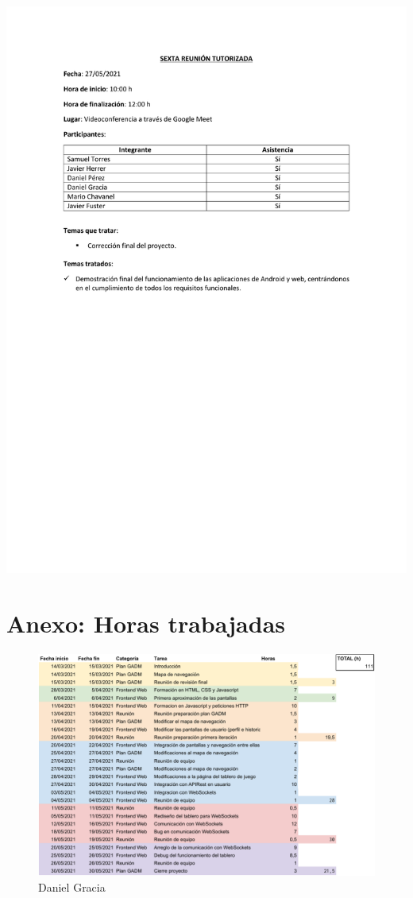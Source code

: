 \documentclass{article}
\begin{document}
\includegraphics[width=\textwidth]{../images/actas/Acta_reunion_tutorizada_6.pdf}
\break

\FloatBarrier
\section{Anexo: Horas trabajadas} \label{anexo:horas-trabajadas}


\begin{figure}[h]
    \centering
    \includegraphics[width=\textwidth]{../images/horasTrabajadas/daniel-gracia.pdf}
    \caption{Daniel Gracia}
\end{figure}
\end{document}
